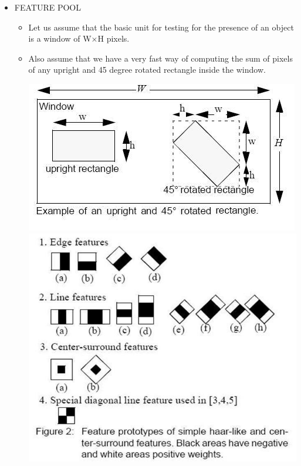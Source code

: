 \documentclass[10pt,a4paper,twoside]{report}
\begin{document}
\begin{appendix}
\begin{enumerate}
\begin{itemize}
\item FEATURE POOL
\begin{itemize}
\item Let us assume that the basic unit for testing for the presence of an object is a window of W×H pixels.
\item Also assume that we have a very fast way of computing the sum of pixels of any upright and 45 degree rotated rectangle inside the window.
\begin{center}
\includegraphics[scale=.5]{kira1}\\
\vspace{.2cm}
\includegraphics[scale=.5]{kira2}
\end{center}


\end{itemize}
\end{itemize}
\end{enumerate}
\end{appendix}
\end{document}
